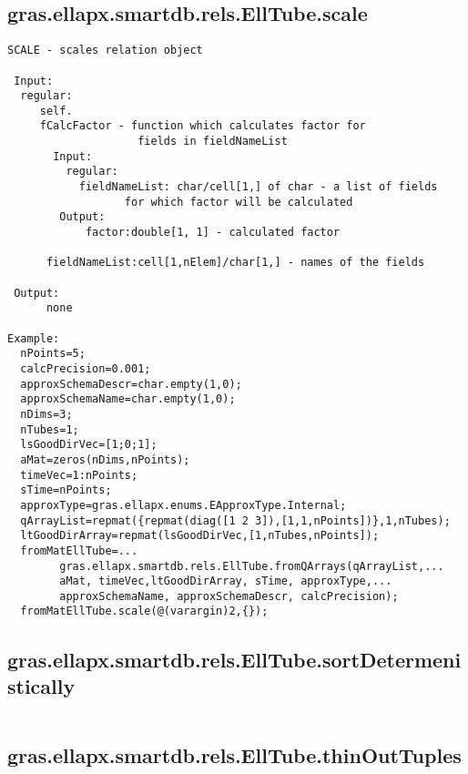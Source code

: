 \subsection{\texorpdfstring{gras.ellapx.smartdb.rels.EllTube.scale}{scale}}\label{method:gras.ellapx.smartdb.rels.EllTube.scale}
\begin{verbatim}
SCALE - scales relation object

 Input:
  regular:
     self.
     fCalcFactor - function which calculates factor for
                    fields in fieldNameList
       Input:
         regular:
           fieldNameList: char/cell[1,] of char - a list of fields
                  for which factor will be calculated
        Output:
            factor:double[1, 1] - calculated factor

      fieldNameList:cell[1,nElem]/char[1,] - names of the fields

 Output:
      none

Example:
  nPoints=5;
  calcPrecision=0.001;
  approxSchemaDescr=char.empty(1,0);
  approxSchemaName=char.empty(1,0);
  nDims=3;
  nTubes=1;
  lsGoodDirVec=[1;0;1];
  aMat=zeros(nDims,nPoints);
  timeVec=1:nPoints;
  sTime=nPoints;
  approxType=gras.ellapx.enums.EApproxType.Internal;
  qArrayList=repmat({repmat(diag([1 2 3]),[1,1,nPoints])},1,nTubes);
  ltGoodDirArray=repmat(lsGoodDirVec,[1,nTubes,nPoints]);
  fromMatEllTube=...
        gras.ellapx.smartdb.rels.EllTube.fromQArrays(qArrayList,...
        aMat, timeVec,ltGoodDirArray, sTime, approxType,...
        approxSchemaName, approxSchemaDescr, calcPrecision);
  fromMatEllTube.scale(@(varargin)2,{});
\end{verbatim}
\subsection{\texorpdfstring{gras.ellapx.smartdb.rels.EllTube.sortDetermenistically}{sortDetermenistically}}\label{method:gras.ellapx.smartdb.rels.EllTube.sortDetermenistically}
\begin{verbatim}

\end{verbatim}
\subsection{\texorpdfstring{gras.ellapx.smartdb.rels.EllTube.thinOutTuples}{thinOutTuples}}\label{method:gras.ellapx.smartdb.rels.EllTube.thinOutTuples}
\begin{verbatim}

\end{verbatim}
